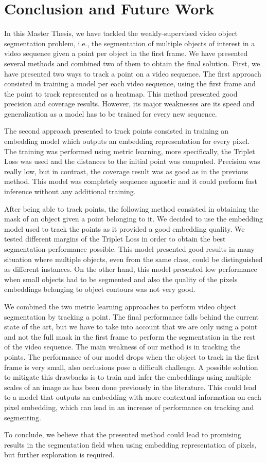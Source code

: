 
\chapter{Conclusion and Future Work}
\label{cha:conclusionsfuturework}

In this Master Thesis, we have tackled the weakly-supervised video object segmentation problem, i.e., 
the segmentation of multiple objects of interest in a video sequence given a point per object in the first frame.
We have presented several methods and combined two of them to obtain the final solution.
First, we have presented two ways to track a point on a video sequence.
The first approach consisted in training a model per each video sequence, 
using the first frame and the point to track represented as a heatmap.
This method presented good precision and coverage results. 
However, its major weaknesses are its speed and generalization as a model has to be trained for every new sequence.

The second approach presented to track points consisted in training an embedding model which outputs an embedding representation for every pixel.
The training was performed using metric learning, more specifically, the Triplet Loss was used and the distances to the initial point was computed.
Precision was really low, but in contrast, 
the coverage result was as good as in the previous method.
This model was completely sequence agnostic and it could perform fast inference without any additional training.

After being able to track points, the following method consisted in obtaining the mask of an object given a point belonging to it.
We decided to use the embedding model used to track the points as it provided a good embedding quality.
We tested different margins of the Triplet Loss in order to obtain the best segmentation performance possible.
This model presented good results in many situation where multiple objects, even from the same class, 
could be distinguished as different instances.
On the other hand, 
this model presented low performance when small objects had to be segmented and also the quality of the pixels embeddings belonging to object contours was not very good.

We combined the two metric learning approaches to perform video object segmentation by tracking a point. The final performance falls behind the current state of the art, but we have to take into account that we are only using a point and not the full mask in the first frame to perform the segmentation in the rest of the video sequence.
The main weakness of our method is in tracking the points. The performance of our model drops when the object to track in the first frame is very small, also occlusions pose a difficult challenge.
A possible solution to mitigate this drawbacks is to train and infer the embeddings using multiple scales of an image as has been done previously in the literature.
This could lead to a model that outputs an embedding with more contextual information on each pixel embedding, which can lead in an increase of performance on tracking and segmenting.

To conclude, we believe that the presented method could lead to promising results in the segmentation field when using embedding representation of pixels, but further exploration is required. 
